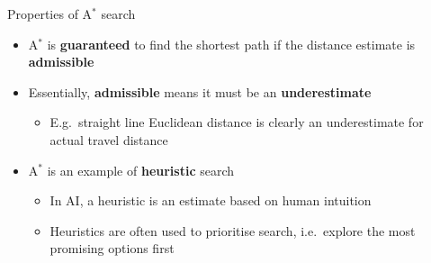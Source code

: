 \begin{frame}{Properties of A$^*$ search}
    \begin{itemize}
        \item A$^*$ is \textbf{guaranteed} to find the shortest path
            if the distance estimate is \textbf{admissible} \pause
        \item Essentially, \textbf{admissible} means it must be an \textbf{underestimate} \pause
            \begin{itemize}
                \item E.g.\ straight line Euclidean distance is clearly an underestimate
                    for actual travel distance \pause
            \end{itemize}
        \item A$^*$ is an example of \textbf{heuristic} search \pause
            \begin{itemize}
                \item In AI, a heuristic is an estimate based on human intuition \pause
                \item Heuristics are often used to prioritise search,
                    i.e.\ explore the most promising options first
            \end{itemize}
    \end{itemize}
\end{frame}

